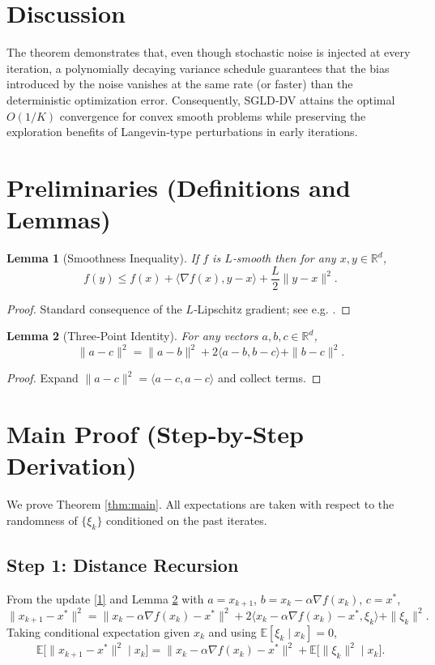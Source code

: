 \documentclass{article}
\newtheorem{lemma}{Lemma}
\newcommand{\E}{\mathbb{E}}
\begin{document}
\section*{Discussion}
The theorem demonstrates that, even though stochastic noise is injected at every iteration, a polynomially decaying variance schedule guarantees that the bias introduced by the noise vanishes at the same rate (or faster) than the deterministic optimization error. Consequently, SGLD‑DV attains the optimal $O(1/K)$ convergence for convex smooth problems while preserving the exploration benefits of Langevin‑type perturbations in early iterations.

\newpage
\section*{Preliminaries (Definitions and Lemmas)}
\begin{lemma}[Smoothness Inequality]\label{lem:smooth}
If $f$ is $L$‑smooth then for any $x,y\in\mathbb{R}^{d}$,
\[
f(y)\le f(x)+\langle\nabla f(x),y-x\rangle+\frac{L}{2}\|y-x\|^{2}.
\tag{5}
\]
\end{lemma}
\begin{proof}
Standard consequence of the $L$‑Lipschitz gradient; see e.g. \cite{nesterov2004introductory}.
\end{proof}

\begin{lemma}[Three‑Point Identity]\label{lem:three}
For any vectors $a,b,c\in\mathbb{R}^{d}$,
\[
\|a-c\|^{2}= \|a-b\|^{2}+2\langle a-b, b-c\rangle+\|b-c\|^{2}.
\tag{6}
\]
\end{lemma}
\begin{proof}
Expand $\|a-c\|^{2}=\langle a-c,a-c\rangle$ and collect terms.
\end{proof}

\section*{Main Proof (Step‑by‑Step Derivation)}
We prove Theorem \ref{thm:main}. All expectations are taken with respect to the randomness of $\{\xi_{k}\}$ conditioned on the past iterates.

\subsection*{Step 1: Distance Recursion}
From the update \eqref{1} and Lemma \ref{lem:three} with $a=x_{k+1}$, $b=x_{k}-\alpha\nabla f(x_{k})$, $c=x^{*}$,
\[
\|x_{k+1}-x^{*}\|^{2}
= \|x_{k}-\alpha\nabla f(x_{k})-x^{*}\|^{2}
   +2\langle x_{k}-\alpha\nabla f(x_{k})-x^{*},\xi_{k}\rangle
   +\|\xi_{k}\|^{2}.                                            \tag{7}
\]
Taking conditional expectation given $x_{k}$ and using $\E[\xi_{k}\mid x_{k}]=0$,
\[
\E\!\bigl[\|x_{k+1}-x^{*}\|^{2}\mid x_{k}\bigr]
= \|x_{k}-\alpha\nabla f(x_{k})-x^{*}\|^{2}
  +\E\!\bigl[\|\xi_{k}\|^{2}\mid x_{k}\bigr].                 \tag{8}
\]
\end{document}
